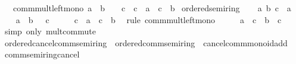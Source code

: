 \begin{isabellebody}
\ \ \ comm{\isacharunderscore}{\kern0pt}mult{\isacharunderscore}{\kern0pt}left{\isacharunderscore}{\kern0pt}mono{\isacharcolon}{\kern0pt}\ {\isachardoublequoteopen}a\ {\isasymle}\ b\ {\isasymLongrightarrow}\ {}\ {\isasymle}\ c\ {\isasymLongrightarrow}\ c\ {\isacharasterisk}{\kern0pt}\ a\ {\isasymle}\ c\ {\isacharasterisk}{\kern0pt}\ b{\isachardoublequoteclose}\isanewline
{}\isanewline
\isanewline
{}\isamarkupfalse%
\ ordered{\isacharunderscore}{\kern0pt}semiring\isanewline
%
\isadelimproof
%
\endisadelimproof
%
\isatagproof
{}\isamarkupfalse%
\isanewline
\ \ \isamarkupfalse%
\ a\ b\ c\ {\isacharcolon}{\kern0pt}{\isacharcolon}{\kern0pt}\ {\isacharprime}{\kern0pt}a\isanewline
\ \ \isamarkupfalse%
\ {\isachardoublequoteopen}a\ {\isasymle}\ b{\isachardoublequoteclose}\ {\isachardoublequoteopen}{}\ {\isasymle}\ c{\isachardoublequoteclose}\isanewline
\ \ \isamarkupfalse%
\ \isamarkupfalse%
\ {\isachardoublequoteopen}c\ {\isacharasterisk}{\kern0pt}\ a\ {\isasymle}\ c\ {\isacharasterisk}{\kern0pt}\ b{\isachardoublequoteclose}\ \isamarkupfalse%
\ {\isacharparenleft}{\kern0pt}rule\ comm{\isacharunderscore}{\kern0pt}mult{\isacharunderscore}{\kern0pt}left{\isacharunderscore}{\kern0pt}mono{\isacharparenright}{\kern0pt}\isanewline
\ \ \isamarkupfalse%
\ \isamarkupfalse%
\ {\isachardoublequoteopen}a\ {\isacharasterisk}{\kern0pt}\ c\ {\isasymle}\ b\ {\isacharasterisk}{\kern0pt}\ c{\isachardoublequoteclose}\ \isamarkupfalse%
\ {\isacharparenleft}{\kern0pt}simp\ only{\isacharcolon}{\kern0pt}\ mult{\isachardot}{\kern0pt}commute{\isacharparenright}{\kern0pt}\isanewline
{}\isamarkupfalse%
%
\endisatagproof
{\isafoldproof}%
%
\isadelimproof
\isanewline
%
\endisadelimproof
\isanewline
{}\isamarkupfalse%
\isanewline
\isanewline
{}\isamarkupfalse%
\ ordered{\isacharunderscore}{\kern0pt}cancel{\isacharunderscore}{\kern0pt}comm{\isacharunderscore}{\kern0pt}semiring\ {\isacharequal}{\kern0pt}\ ordered{\isacharunderscore}{\kern0pt}comm{\isacharunderscore}{\kern0pt}semiring\ {\isacharplus}{\kern0pt}\ cancel{\isacharunderscore}{\kern0pt}comm{\isacharunderscore}{\kern0pt}monoid{\isacharunderscore}{\kern0pt}add\isanewline
{}\isanewline
\isanewline
{}\isamarkupfalse%
\ comm{\isacharunderscore}{\kern0pt}semiring{\isacharunderscore}{\kern0pt}{}{\isacharunderscore}{\kern0pt}cancel%

\end{isabellebody}
